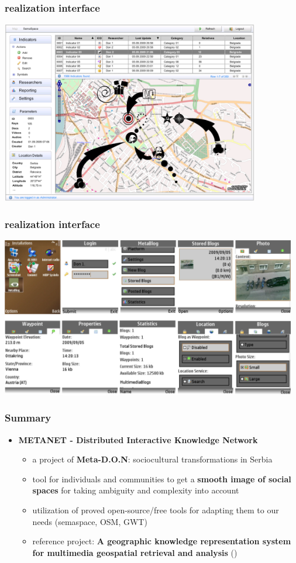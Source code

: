 \documentclass[blue]{beamer}
\begin{document}
\frame
{
\frametitle{\textbf{realization interface}}
\includegraphics[width=0.85\textwidth]{bin/features/metamap/02_gui_metamap_admin_start_update.png}
}

\frame
{
\frametitle{\textbf{realization interface}}
\includegraphics[width=0.97\textwidth]{bin/features/metablog/01_gui_metablog_update.png}
}


\frame
{
\frametitle{\textbf{Summary}}
\begin{itemize}
\item \textbf{METANET - Distributed Interactive Knowledge Network}
	\begin{itemize}
		\item a project of \textbf{Meta-D.O.N}: sociocultural transformations in Serbia
		\item tool for individuals and communities to get a \textbf{smooth image of social spaces} for taking ambiguity and complexity into account
		\item utilization of proved open-source/free tools for adapting them to our needs (semaspace, OSM, GWT)
		\item reference project: \textbf{A geographic knowledge representation system for multimedia geospatial retrieval and analysis}
		()
	\end{itemize}
\end{itemize}
}
\end{document}
